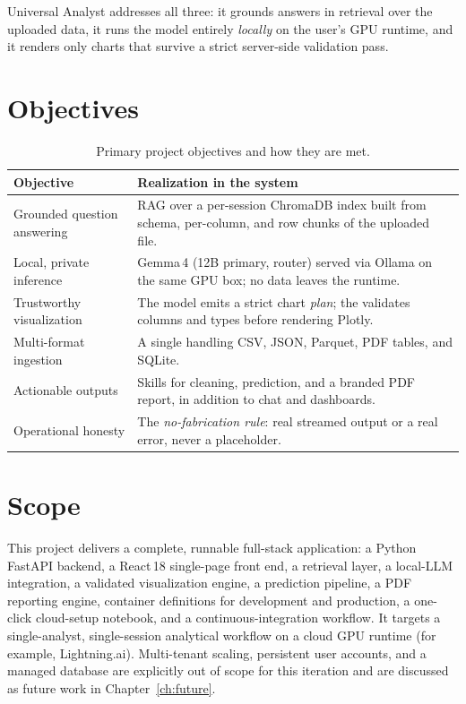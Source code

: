 Universal Analyst addresses all three: it grounds answers in retrieval over the
uploaded data, it runs the model entirely \emph{locally} on the user's GPU
runtime, and it renders only charts that survive a strict server-side
validation pass.

\section{Objectives}
\begin{table}[h]
\centering
\caption{Primary project objectives and how they are met.}
\begin{tabularx}{\linewidth}{@{}L{4.7cm} X@{}}
\toprule
\textbf{Objective} & \textbf{Realization in the system} \\
\midrule
Grounded question answering & RAG over a per-session ChromaDB index built from
schema, per-column, and row chunks of the uploaded file. \\
Local, private inference & Gemma\,4 (12B primary,  router) served via
Ollama on the same GPU box; no data leaves the runtime. \\
Trustworthy visualization & The model emits a strict chart \emph{plan}; the
 validates columns and types before rendering Plotly. \\
Multi-format ingestion & A single  handling CSV, JSON,
Parquet, PDF tables, and SQLite. \\
Actionable outputs & Skills for cleaning, prediction, and a branded PDF report,
in addition to chat and dashboards. \\
Operational honesty & The \emph{no-fabrication rule}: real streamed output or a
real error, never a placeholder. \\
\bottomrule
\end{tabularx}
\end{table}

\section{Scope}
This project delivers a complete, runnable full-stack application: a Python
 FastAPI backend, a React\,18 single-page front end, a retrieval
layer, a local-LLM integration, a validated visualization engine, a prediction
pipeline, a PDF reporting engine, container definitions for development and
production, a one-click cloud-setup notebook, and a continuous-integration
workflow. It targets a single-analyst, single-session analytical workflow on a
cloud GPU runtime (for example, Lightning.ai). Multi-tenant scaling, persistent
user accounts, and a managed database are explicitly out of scope for this
iteration and are discussed as future work in Chapter~\ref{ch:future}.

